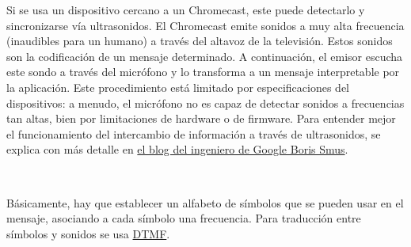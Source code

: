 Si se usa un dispositivo cercano a un Chromecast, este puede detectarlo y sincronizarse vía ultrasonidos.
El Chromecast emite sonidos a muy alta frecuencia (inaudibles para un humano) a través del altavoz de la televisión.
Estos sonidos son la codificación de un mensaje determinado.
A continuación, el emisor escucha este sondo a través del micrófono y lo transforma a un mensaje interpretable por la aplicación.
Este procedimiento está limitado por especificaciones del dispositivos: a menudo, el micrófono no es capaz de detectar sonidos a frecuencias tan altas, bien por limitaciones de hardware o de firmware.
Para entender mejor el funcionamiento del intercambio de información a través de ultrasonidos, se explica con más detalle en \href{http://smus.com/ultrasonic-networking/}{el blog del ingeniero de Google Boris Smus}.

\

Básicamente, hay que establecer un alfabeto de símbolos que se pueden usar en el mensaje, asociando a cada símbolo una frecuencia. Para traducción entre símbolos y sonidos se usa \href{https://en.wikipedia.org/wiki/Dual-tone_multi-frequency_signaling}{DTMF}.
